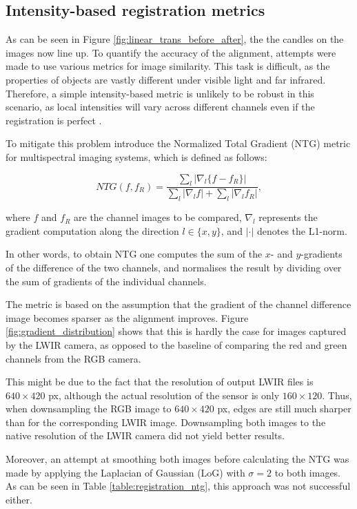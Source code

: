 \documentclass{l4proj}
\begin{document}
\subsection{Intensity-based registration metrics}

As can be seen in Figure \ref{fig:linear_trans_before_after}, the the candles on the images now line up. To quantify the accuracy of the alignment, attempts were made to use various metrics for image similarity. This task is difficult, as the properties of objects are vastly different under visible light and far infrared. Therefore, a simple intensity-based metric is unlikely to be robust in this scenario, as local intensities will vary across different channels even if the registration is perfect \citep{myronenko_intensity-based_2010}.

To mitigate this problem \citet{chen_normalized_2018} introduce the Normalized Total Gradient (NTG) metric for multispectral imaging systems, which is defined as follows:

\begin{equation}
  NTG(f, f_R) = \frac{\sum_l |\nabla_l \{f - f_R\}|}{\sum_l | \nabla_l f | + \sum_l | \nabla_l f_R|},
\end{equation}

where $f$ and $f_R$ are the channel images to be compared, $\nabla_l$ represents the gradient computation along the direction $l \in \{x, y\}$, and $| \cdot |$ denotes the L1-norm.

In other words, to obtain NTG one computes the sum of the $x$- and $y$-gradients of the difference of the two channels, and normalises the result by dividing over the sum of gradients of the individual channels.

The metric is based on the assumption that the gradient of the channel difference image becomes sparser as the alignment improves. Figure \ref{fig:gradient_distribution} shows that this is hardly the case for images captured by the LWIR camera, as opposed to the baseline of comparing the red and green channels from the RGB camera.

This might be due to the fact that the resolution of output LWIR files is $640 \times 420$ px, although the actual resolution of the sensor is only $160 \times 120$. Thus, when downsampling the RGB image to $640 \times 420$ px, edges are still much sharper than for the corresponding LWIR image. Downsampling both images to the native resolution of the LWIR camera did not yield better results.

Moreover, an attempt at smoothing both images before calculating the NTG was made by applying the Laplacian of Gaussian (LoG) with $\sigma=2$ to both images. As can be seen in Table \ref{table:registration_ntg}, this approach was not successful either. 
\end{document}
